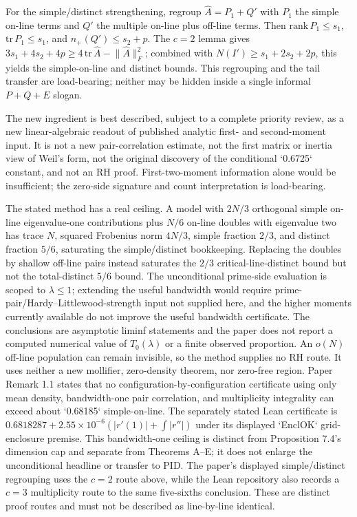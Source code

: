 \documentclass[11pt]{article}
\begin{document}
\begin{markdown}
For the simple/distinct strengthening, regroup
$\widehat A=P_1+Q'$ with $P_1$ the simple on-line terms and $Q'$ the multiple on-line plus off-line
terms. Then $\mathrm{rank}\,P_1\le s_1$, $\mathrm{tr}\,P_1\le s_1$, and
$n_+(Q')\le s_2+p$. The $c=2$ lemma gives
$3s_1+4s_2+4p\ge4\,\mathrm{tr}\,\widehat A-\lVert\widehat A\rVert_F^2$; combined with
$N(I')\ge s_1+2s_2+2p$, this yields the simple-on-line and distinct bounds. This regrouping and the
tail transfer are load-bearing; neither may be hidden inside a single informal $P+Q+E$ slogan.

The new ingredient is best described, subject to a complete priority review, as a new
linear-algebraic readout of published analytic first- and second-moment input. It is not a new
pair-correlation estimate, not the first matrix or inertia view of Weil's form, not the original
discovery of the conditional `0.6725` constant, and not an RH proof. First-two-moment information
alone would be insufficient; the zero-side signature and count interpretation is load-bearing.

The stated method has a real ceiling. A model with $2N/3$ orthogonal simple on-line
eigenvalue-one contributions plus $N/6$ on-line doubles with eigenvalue two has trace $N$,
squared Frobenius norm $4N/3$, simple fraction $2/3$, and distinct fraction $5/6$, saturating the
simple/distinct bookkeeping. Replacing the doubles by shallow off-line pairs instead saturates the
$2/3$ critical-line-distinct bound but not the total-distinct $5/6$ bound. The unconditional
prime-side evaluation is scoped to $\lambda\le1$; extending the useful bandwidth would require
prime-pair/Hardy--Littlewood-strength input not supplied here, and the higher moments currently
available do not improve the useful bandwidth certificate. The conclusions are asymptotic liminf
statements and the paper does not report a computed numerical value of $T_0(\lambda)$ or a finite
observed proportion. An $o(N)$ off-line population can remain invisible, so the method supplies no
RH route. It uses neither a new mollifier, zero-density theorem, nor zero-free region. Paper Remark
1.1 states that no configuration-by-configuration certificate using only mean density,
bandwidth-one pair correlation, and multiplicity integrality can exceed about `0.68185`
simple-on-line. The separately stated Lean certificate is
$0.6818287+2.55\times10^{-6}(|r'(1)|+\int|r''|)$ under its displayed `EnclOK` grid-enclosure
premise. This bandwidth-one ceiling is distinct from Proposition 7.4's dimension cap and separate
from Theorems A--E; it does not enlarge the unconditional headline or transfer to PID. The
paper's displayed simple/distinct regrouping uses the $c=2$ route above, while the Lean repository
also records a $c=3$ multiplicity route to the same five-sixths conclusion. These are distinct proof
routes and must not be described as line-by-line identical.


\end{markdown}
\end{document}
